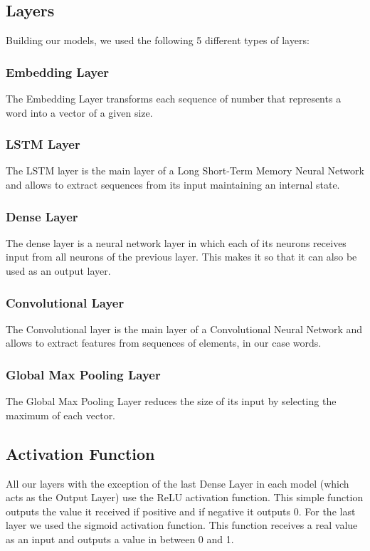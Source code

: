 \documentclass[conference]{IEEEtran}
\begin{document}
\subsection{Layers} Building our models, we used the following 5 different types of layers:

\subsubsection{Embedding Layer} The Embedding Layer transforms each sequence of number that represents a word into a vector of a given size.

\subsubsection{LSTM Layer} The LSTM layer is the main layer of a Long Short-Term Memory Neural Network and allows to extract sequences from its input maintaining an internal state.

\subsubsection{Dense Layer} The dense layer is a neural network layer in which each of its neurons receives input from all neurons of the previous layer. This makes it so that it can also be used as an output layer.

\subsubsection{Convolutional Layer} The Convolutional layer is the main layer of a Convolutional Neural Network and allows to extract features from sequences of elements, in our case words.

\subsubsection{Global Max Pooling Layer} The Global Max Pooling Layer reduces the size of its input by selecting the maximum of each vector.

\subsection{Activation Function \cite{L} \cite{O}} All our layers with the exception of the last Dense Layer in each model (which acts as the Output Layer) use the ReLU activation function. This simple function outputs the value it received if positive and if negative it outputs 0. For the last layer we used the sigmoid activation function. This function receives a real value as an input and outputs a value in between 0 and 1.
\end{document}
